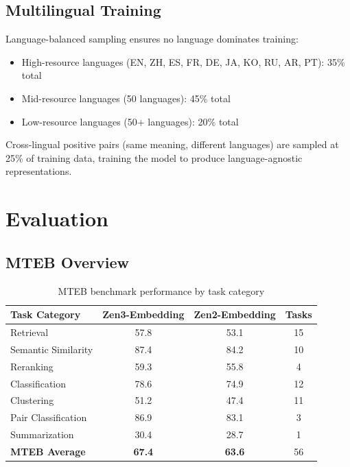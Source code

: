 \documentclass[11pt,a4paper]{article}
\begin{document}
\subsection{Multilingual Training}

Language-balanced sampling ensures no language dominates training:

\begin{itemize}
\item High-resource languages (EN, ZH, ES, FR, DE, JA, KO, RU, AR, PT): 35\% total
\item Mid-resource languages (50 languages): 45\% total
\item Low-resource languages (50+ languages): 20\% total
\end{itemize}

Cross-lingual positive pairs (same meaning, different languages) are sampled at 25\%
of training data, training the model to produce language-agnostic representations.

\section{Evaluation}
\label{sec:eval}

\subsection{MTEB Overview}

\begin{table}[H]
\centering
\caption{MTEB benchmark performance by task category}
\begin{tabular}{lccc}
\toprule
\textbf{Task Category} & \textbf{Zen3-Embedding} & \textbf{Zen2-Embedding} & \textbf{Tasks} \\
\midrule
Retrieval          & 57.8 & 53.1 & 15 \\
Semantic Similarity & 87.4 & 84.2 & 10 \\
Reranking          & 59.3 & 55.8 & 4  \\
Classification     & 78.6 & 74.9 & 12 \\
Clustering         & 51.2 & 47.4 & 11 \\
Pair Classification & 86.9 & 83.1 & 3  \\
Summarization      & 30.4 & 28.7 & 1  \\
\textbf{MTEB Average} & \textbf{67.4} & \textbf{63.6} & 56 \\
\bottomrule
\end{tabular}
\label{tab:mteb}
\end{table}
\end{document}

